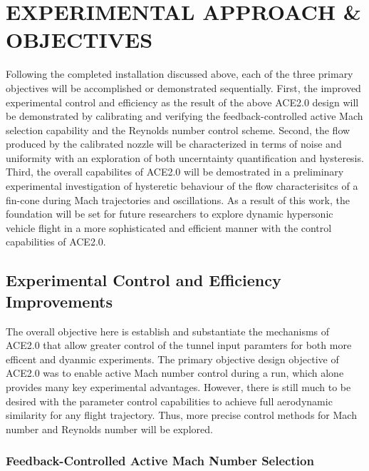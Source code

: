 %
%  
%


\chapter{EXPERIMENTAL APPROACH \& OBJECTIVES}

Following the completed installation discussed above, each of the three primary objectives will be accomplished or demonstrated sequentially. First, the improved experimental control and efficiency as the result of the above ACE2.0 design will be demonstrated by calibrating and verifying the feedback-controlled active Mach selection capability and the Reynolds number control scheme. Second, the flow produced by the calibrated nozzle will be characterized in terms of noise and uniformity with an exploration of both uncerntainty quantification and hysteresis. Third, the overall capabilites of ACE2.0 will be demostrated in a preliminary experimental investigation of hysteretic behaviour of the flow characterisitcs of a fin-cone during Mach trajectories and oscillations. As a result of this work, the foundation will be set for future researchers to explore dynamic hypersonic vehicle flight in a more sophisticated and efficient manner with the control capabilities of ACE2.0.


\section{Experimental Control and Efficiency Improvements} 

The overall objective here is establish and substantiate the mechanisms of ACE2.0 that allow greater control of the tunnel input paramters for both more efficent and dyanmic experiments. The primary objective design objective of ACE2.0 was to enable active Mach number control during a run, which alone provides many key experimental advantages. However, there is still much to be desired with the parameter control capabilities to achieve full aerodynamic similarity for any flight trajectory. Thus, more precise control methods for Mach number and Reynolds number will be explored.

\subsection{Feedback-Controlled Active Mach Number Selection}

